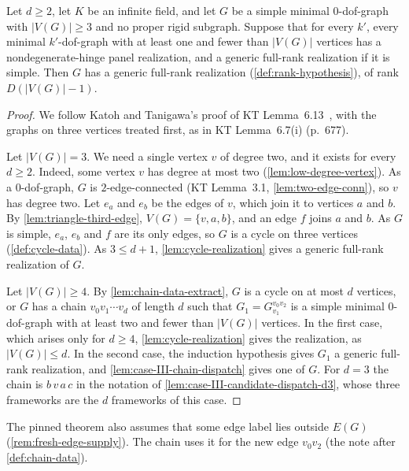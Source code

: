 \begin{lemma}[Case~III: no proper rigid subgraph and $k = 0$; KT Lemma~6.13]
  \label{lem:case-III}
  \leanok
  Let $d \ge 2$, let $K$ be an infinite field, and let $G$ be a simple
  minimal $0$-dof-graph with $|V(G)| \ge 3$ and no proper rigid
  subgraph. Suppose that for every $k'$, every minimal $k'$-dof-graph
  with at least one and fewer than $|V(G)|$ vertices has a
  nondegenerate-hinge panel realization, and a generic full-rank
  realization if it is simple. Then $G$ has a generic full-rank
  realization (\cref{def:rank-hypothesis}), of rank $D(|V(G)| - 1)$.
\end{lemma}
\begin{proof}
  \leanok
  We follow Katoh and Tanigawa's proof of KT
  Lemma~6.13~\cite[p.~692]{katohTanigawa2011}, with the graphs on three
  vertices treated first, as in KT Lemma~6.7(i) (p.~677).

  Let $|V(G)| = 3$. We need a single vertex $v$ of degree two, and it
  exists for every $d \ge 2$. Indeed, some vertex $v$ has degree at most
  two (\cref{lem:low-degree-vertex}). As a $0$-dof-graph, $G$ is
  $2$-edge-connected (KT Lemma~3.1, \cref{lem:two-edge-conn}), so $v$
  has degree two. Let $e_a$ and $e_b$ be the edges of $v$, which join it
  to vertices $a$ and $b$. By
  \cref{lem:triangle-third-edge}, $V(G) = \{v, a, b\}$, and an edge $f$
  joins $a$ and $b$. As $G$ is simple, $e_a$, $e_b$ and $f$ are its only
  edges, so $G$ is a cycle on three vertices (\cref{def:cycle-data}). As
  $3 \le d + 1$, \cref{lem:cycle-realization} gives a generic full-rank
  realization of $G$.

  Let $|V(G)| \ge 4$. By \cref{lem:chain-data-extract}, $G$ is a cycle
  on at most $d$ vertices, or $G$ has a chain $v_0 v_1 \cdots v_d$ of
  length $d$ such that $G_1 = G_{v_1}^{v_0 v_2}$ is a simple minimal
  $0$-dof-graph with at least two and fewer than $|V(G)|$ vertices. In
  the first case, which arises only for $d \ge 4$,
  \cref{lem:cycle-realization} gives the realization, as
  $|V(G)| \le d$. In the second case, the induction hypothesis gives
  $G_1$ a generic full-rank realization, and
  \cref{lem:case-III-chain-dispatch} gives one of $G$. For $d = 3$ the
  chain is $b\,v\,a\,c$ in the notation of
  \cref{lem:case-III-candidate-dispatch-d3}, whose three frameworks are
  the $d$ frameworks of this case.
\end{proof}

\begin{fmlnote}
  The pinned theorem also assumes that some edge label lies outside
  $E(G)$ (\cref{rem:fresh-edge-supply}). The chain uses it for the new
  edge $v_0 v_2$ (the note after \cref{def:chain-data}).
\end{fmlnote}
